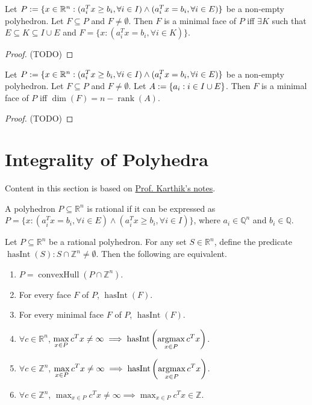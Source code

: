 \documentclass[a4paper, 12pt, fleqn]{article}
\newenvironment*{tightenum}{\begin{enumerate}[noitemsep]}{\end{enumerate}}
\DeclareMathOperator{\rank}{rank}
\DeclareMathOperator{\hasInt}{hasInt}
\newcommand*{\karthikLecSeven}{http://karthik.ise.illinois.edu/courses/ie511/lectures-sp-21/lecture-7.pdf}
\begin{document}
\begin{theorem}
Let $P := \{x \in \mathbb{R}^n: (a_i^Tx \ge b_i, \forall i \in I) \wedge (a_i^Tx = b_i, \forall i \in E)\}$
be a non-empty polyhedron. Let $F \subseteq P$ and $F \neq \emptyset$.
Then $F$ is a minimal face of $P$ iff $\exists K$ such that $E \subseteq K \subseteq I \cup E$
and $F = \{x: (a_i^Tx = b_i, \forall i \in K)\}$.
\end{theorem}
\begin{proof}
(TODO)
\end{proof}

\begin{theorem}
Let $P := \{x \in \mathbb{R}^n: (a_i^Tx \ge b_i, \forall i \in I) \wedge (a_i^Tx = b_i, \forall i \in E)\}$
be a non-empty polyhedron. Let $F \subseteq P$ and $F \neq \emptyset$.
Let $A := \{a_i: i \in I \cup E\}$.
Then $F$ is a minimal face of $P$ iff $\dim(F) = n - \rank(A)$.
\end{theorem}
\begin{proof}
(TODO)
\end{proof}

\section{Integrality of Polyhedra}

Content in this section is based on \href{\karthikLecSeven}{Prof. Karthik's notes}.

\begin{definition}
A polyhedron $P \subseteq \mathbb{R}^n$ is rational if it can be expressed as
$P = \{x: (a_i^Tx = b_i, \forall i \in E) \wedge (a_i^Tx \ge b_i, \forall i \in I)\}$,
where $a_i \in \mathbb{Q}^n$ and $b_i \in \mathbb{Q}$.
\end{definition}

\begin{theorem}
Let $P \subseteq \mathbb{R}^n$ be a rational polyhedron.
For any set $S \in \mathbb{R}^n$, define the predicate
$\hasInt(S): S \cap \mathbb{Z}^n \neq \emptyset$.
Then the following are equivalent.
\begin{tightenum}
\item $P = \operatorname{convexHull}(P \cap \mathbb{Z}^n)$.
\item For every face $F$ of $P$, $\hasInt(F)$.
\item For every minimal face $F$ of $P$, $\hasInt(F)$.
\item $\forall c \in \mathbb{R}^n$,
$\displaystyle \max_{x \in P} c^Tx \neq \infty \implies \hasInt\left(\argmax_{x \in P} c^Tx\right)$.
\item $\forall c \in \mathbb{Z}^n$,
$\displaystyle \max_{x \in P} c^Tx \neq \infty \implies \hasInt\left(\argmax_{x \in P} c^Tx\right)$.
\item $\forall c \in \mathbb{Z}^n$,
$\displaystyle \max_{x \in P} c^Tx \neq \infty \implies \max_{x \in P} c^Tx \in \mathbb{Z}$.
\end{tightenum}
\end{theorem}
\end{document}
